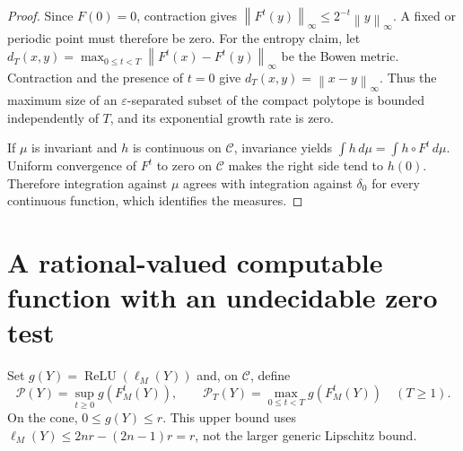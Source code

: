 \documentclass[11pt,letterpaper]{article}
\numberwithin{equation}{section}
\newtheorem{proposition}[theorem]{Proposition}
\theoremstyle{definition}
\theoremstyle{remark}
\newcommand{\norm}[1]{\left\lVert #1\right\rVert_{\infty}}
\newcommand{\srcmark}[1]{\par\noindent{\small\itshape [source~#1]}\par}
\newcommand{\ReLU}{\operatorname{ReLU}}
\newcommand{\Cone}{\mathcal C}
\newcommand{\Peak}{\mathcal P}
\begin{document}
\begin{proof}
Since $F(0)=0$, contraction gives $\norm{F^t(y)}\le2^{-t}\norm{y}$.
A fixed or periodic point must therefore be zero. For the entropy claim,
let $d_T(x,y)=\max_{0\le t<T}\norm{F^t(x)-F^t(y)}$ be the Bowen metric.
Contraction and the presence of $t=0$ give $d_T(x,y)=\norm{x-y}$.
Thus the maximum size of an $\varepsilon$-separated subset of the compact
polytope is bounded independently of $T$, and its exponential growth rate
is zero.

If $\mu$ is invariant and $h$ is continuous on $\Cone$, invariance yields
$\int h\,d\mu=\int h\circ F^t\,d\mu$. Uniform convergence of $F^t$ to zero
on $\Cone$ makes the right side tend to $h(0)$. Therefore integration
against $\mu$ agrees with integration against $\delta_0$ for every
continuous function, which identifies the measures.
\end{proof}

\section{A rational-valued computable function with an undecidable zero test}
\label{pqc:sc:sec:peak}
\srcmark{14}

Set $g(Y)=\ReLU(\ell_M(Y))$ and, on $\Cone$, define
\begin{equation}\label{pqc:sc:eq:peak}
 \Peak(Y)=\sup_{t\ge0}g(F_M^t(Y)),\qquad
 \Peak_T(Y)=\max_{0\le t<T}g(F_M^t(Y))\quad(T\ge1).
\end{equation}
On the cone, $0\le g(Y)\le r$. This upper bound uses
$\ell_M(Y)\le2nr-(2n-1)r=r$, not the larger generic Lipschitz bound.
\end{document}
